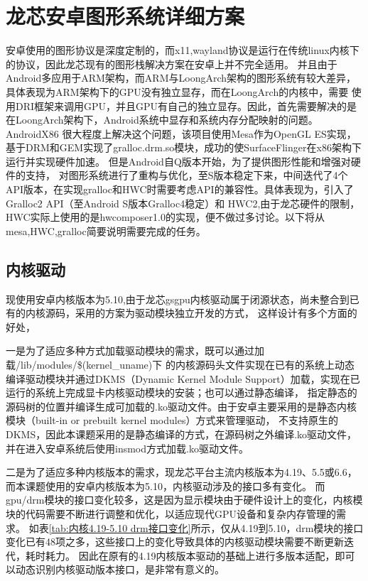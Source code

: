 \section{龙芯安卓图形系统详细方案}
安卓使用的图形协议是深度定制的，而x11,wayland协议是运行在传统linux内核下的协议，因此龙芯现有的图形栈解决方案在安卓上并不完全适用。
并且由于Android多应用于ARM架构，而ARM与LoongArch架构的图形系统有较大差异，具体表现为ARM架构下的GPU没有独立显存\cite{Inki}，而在LoongArch的内核中，需要
使用DRI框架来调用GPU，并且GPU有自己的独立显存。因此，首先需要解决的是在LoongArch架构下，Android系统中显存和系统内存分配映射的问题。AndroidX86\cite{AndroidX86}
很大程度上解决这个问题，该项目使用Mesa作为OpenGL ES实现，基于DRM和GEM实现了gralloc.drm.so模块，成功的使SurfaceFlinger在x86架构下运行并实现硬件加速\cite{XTYY201710015}。
但是Android自Q版本开始，为了提供图形性能和增强对硬件的支持，
对图形系统进行了重构与优化，至S版本稳定下来，中间迭代了4个API版本，在实现gralloc和HWC时需要考虑API的兼容性。具体表现为，引入了Gralloc2 API（至Android S版本Gralloc4稳定）和
HWC2,由于龙芯硬件的限制，HWC实际上使用的是hwcomposer1.0的实现，便不做过多讨论。以下将从mesa,HWC,gralloc简要说明需要完成的任务。

\subsection{内核驱动}
现使用安卓内核版本为5.10,由于龙芯gsgpu内核驱动属于闭源状态，尚未整合到已有的内核源码，采用的方案为驱动模块独立开发的方式，
这样设计有多个方面的好处，

一是为了适应多种方式加载驱动模块的需求，既可以通过加载/lib/modules/\$(kernel\_uname)下
的内核源码头文件实现在已有的系统上动态编译驱动模块并通过DKMS（Dynamic Kernel Module Support）加载，实现在已运行的系统上完成显卡内核驱动模块的安装；也可以通过静态编译，
指定静态的源码树的位置并编译生成可加载的.ko驱动文件。由于安卓主要采用的是静态内核模块（built-in or prebuilt kernel modules）方式来管理驱动，
不支持原生的DKMS，因此本课题采用的是静态编译的方式，在源码树之外编译.ko驱动文件，并在进入安卓系统后使用insmod方式加载.ko驱动文件。

二是为了适应多种内核版本的需求，现龙芯平台主流内核版本为4.19、5.5或6.6，而本课题使用的安卓内核版本为5.10，内核驱动涉及的接口多有变化。
而gpu/drm模块的接口变化较多，这是因为显示模块由于硬件设计上的变化，内核模块的代码需要不断进行调整和优化，以适应现代GPU设备和复杂内存管理的需求。
如表\ref{tab:内核4.19-5.10 drm接口变化}所示，仅从4.19到5.10，drm模块的接口变化已有48项之多，这些接口上的变化导致具体的内核驱动模块需要不断更新迭代，耗时耗力。
因此在原有的4.19内核版本驱动的基础上进行多版本适配，即可以动态识别内核驱动版本接口，是非常有意义的。

